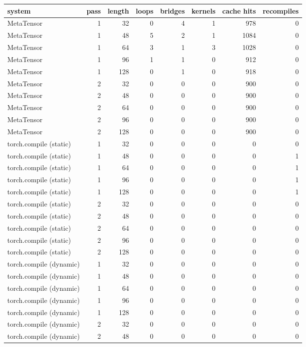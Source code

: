\begin{tabular}{lrrrrrrr}
\toprule
system & pass & length & loops & bridges & kernels & cache hits & recompiles \\
\midrule
MetaTensor & 1 & 32 & 0 & 4 & 1 & 978 & 0 \\
MetaTensor & 1 & 48 & 5 & 2 & 1 & 1084 & 0 \\
MetaTensor & 1 & 64 & 3 & 1 & 3 & 1028 & 0 \\
MetaTensor & 1 & 96 & 1 & 1 & 0 & 912 & 0 \\
MetaTensor & 1 & 128 & 0 & 1 & 0 & 918 & 0 \\
MetaTensor & 2 & 32 & 0 & 0 & 0 & 900 & 0 \\
MetaTensor & 2 & 48 & 0 & 0 & 0 & 900 & 0 \\
MetaTensor & 2 & 64 & 0 & 0 & 0 & 900 & 0 \\
MetaTensor & 2 & 96 & 0 & 0 & 0 & 900 & 0 \\
MetaTensor & 2 & 128 & 0 & 0 & 0 & 900 & 0 \\
torch.compile (static) & 1 & 32 & 0 & 0 & 0 & 0 & 0 \\
torch.compile (static) & 1 & 48 & 0 & 0 & 0 & 0 & 1 \\
torch.compile (static) & 1 & 64 & 0 & 0 & 0 & 0 & 1 \\
torch.compile (static) & 1 & 96 & 0 & 0 & 0 & 0 & 1 \\
torch.compile (static) & 1 & 128 & 0 & 0 & 0 & 0 & 1 \\
torch.compile (static) & 2 & 32 & 0 & 0 & 0 & 0 & 0 \\
torch.compile (static) & 2 & 48 & 0 & 0 & 0 & 0 & 0 \\
torch.compile (static) & 2 & 64 & 0 & 0 & 0 & 0 & 0 \\
torch.compile (static) & 2 & 96 & 0 & 0 & 0 & 0 & 0 \\
torch.compile (static) & 2 & 128 & 0 & 0 & 0 & 0 & 0 \\
torch.compile (dynamic) & 1 & 32 & 0 & 0 & 0 & 0 & 0 \\
torch.compile (dynamic) & 1 & 48 & 0 & 0 & 0 & 0 & 0 \\
torch.compile (dynamic) & 1 & 64 & 0 & 0 & 0 & 0 & 0 \\
torch.compile (dynamic) & 1 & 96 & 0 & 0 & 0 & 0 & 0 \\
torch.compile (dynamic) & 1 & 128 & 0 & 0 & 0 & 0 & 0 \\
torch.compile (dynamic) & 2 & 32 & 0 & 0 & 0 & 0 & 0 \\
torch.compile (dynamic) & 2 & 48 & 0 & 0 & 0 & 0 & 0 \\

\end{tabular}
